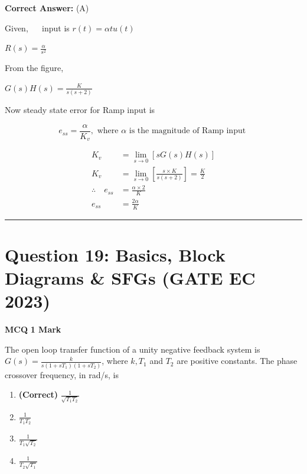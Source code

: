 \documentclass[11pt,a4paper]{article}
\begin{document}
\noindent \textbf{Correct Answer:} (A)

\begin{tcolorbox}[solbox, title=Detailed Solution -- Question 18]
Given, $\quad$ input is $r(t)=\alpha t u(t)$

$R(s)=\frac{\alpha}{s^{2}}$

From the figure,

$G(s) H(s)=\frac{K}{s(s+2)}$

Now steady state error for Ramp input is

\[
e_{s s} =\frac{\alpha}{K_{v}}, \text { where } \alpha \text { is the magnitude of Ramp input }
\]

\[
\begin{aligned}K_{v} & =\lim _{s \rightarrow 0}[s G(s) H(s)] \\
K_{v} & =\lim _{s \rightarrow 0}\left[\frac{s \times K}{s(s+2)}\right]=\frac{K}{2}\\
\therefore \quad e_{s s} & =\frac{\alpha \times 2}{K} \\
e_{s s} & =\frac{2 \alpha}{K}
\end{aligned}
\]
\end{tcolorbox}

\vspace{1.5em}
\hrule
\vspace{1.5em}

\section*{Question 19: Basics, Block Diagrams \& SFGs (GATE EC 2023)}
\noindent \textbf{\color{primary}MCQ} \hfill \textbf{\color{secondary}1 Mark}


\noindent The open loop transfer function of a unity negative feedback system is $G(s)=\frac{k}{s\left(1+s T_{1}\right)\left(1+s T_{2}\right)}$, where $k, T_{1}$ and $T_{2}$ are positive constants. The phase crossover frequency, in rad/s, is


\begin{enumerate}[label=(\Alph*)]
    \item \textbf{(Correct)} $\frac{1}{\sqrt{T_{1} T_{2}}}$
    \item $\frac{1}{T_{1} T_{2}}$
    \item $\frac{1}{T_{1} \sqrt{T_{2}}}$
    \item $\frac{1}{T_{2} \sqrt{T_{1}}}$
\end{enumerate}
\end{document}
